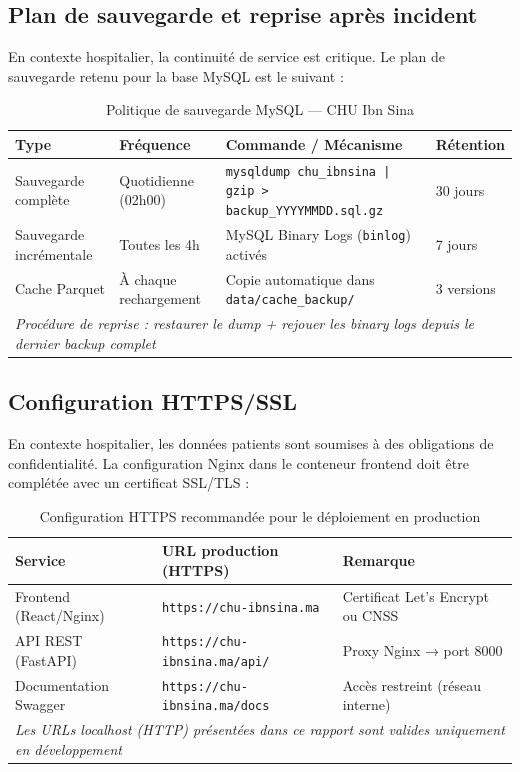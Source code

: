 \documentclass[12pt,a4paper]{report}
\begin{document}
	\subsection{Plan de sauvegarde et reprise après incident}
	
	En contexte hospitalier, la continuité de service est critique. Le plan de
	sauvegarde retenu pour la base MySQL est le suivant :
	
	\begin{table}[H]
		\centering
		\caption{Politique de sauvegarde MySQL — CHU Ibn Sina}
		\renewcommand{\arraystretch}{1.2}
		\begin{tabularx}{\textwidth}{llXl}
			\toprule
			\textbf{Type} & \textbf{Fréquence} & \textbf{Commande / Mécanisme} & \textbf{Rétention} \\
			\midrule
			Sauvegarde complète
			& Quotidienne (02h00)
			& \texttt{mysqldump chu\_ibnsina | gzip > backup\_YYYYMMDD.sql.gz}
			& 30 jours \\
			Sauvegarde incrémentale
			& Toutes les 4h
			& MySQL Binary Logs (\texttt{binlog}) activés
			& 7 jours \\
			Cache Parquet
			& À chaque rechargement
			& Copie automatique dans \texttt{data/cache\_backup/}
			& 3 versions \\
			\midrule
			\multicolumn{4}{l}{\textit{Procédure de reprise : restaurer le dump + rejouer les binary logs depuis le dernier backup complet}} \\
			\bottomrule
		\end{tabularx}
	\end{table}
	\newpage
	\subsection{Configuration HTTPS/SSL}
	
	En contexte hospitalier, les données patients sont soumises à des obligations de
	confidentialité. La configuration Nginx dans le conteneur frontend doit être complétée
	avec un certificat SSL/TLS :
	
	\begin{table}[H]
		\centering
		\caption{Configuration HTTPS recommandée pour le déploiement en production}
		\renewcommand{\arraystretch}{1.2}
		\begin{tabular}{lll}
			\toprule
			\textbf{Service} & \textbf{URL production (HTTPS)} & \textbf{Remarque} \\
			\midrule
			Frontend (React/Nginx) & \texttt{https://chu-ibnsina.ma}       & Certificat Let's Encrypt ou CNSS \\
			API REST (FastAPI)     & \texttt{https://chu-ibnsina.ma/api/}  & Proxy Nginx → port 8000 \\
			Documentation Swagger  & \texttt{https://chu-ibnsina.ma/docs}  & Accès restreint (réseau interne) \\
			\midrule
			\multicolumn{3}{l}{\textit{Les URLs localhost (HTTP) présentées dans ce rapport sont valides uniquement en développement}} \\
			\bottomrule
		\end{tabular}
	\end{table}
	
\end{document}
